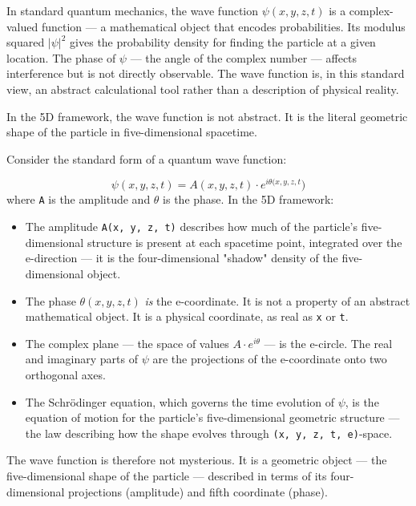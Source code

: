 \documentclass[aps,prd,preprint,superscriptaddress,longbibliography,floatfix]{revtex4-2}
\theoremstyle{remark}
\begin{document}
In standard quantum mechanics, the wave function $\psi(x, y, z, t)$ is a complex-valued function --- a mathematical object that encodes probabilities. Its modulus squared $|\psi|^{2}$ gives the probability density for finding the particle at a given location. The phase of $\psi$ --- the angle of the complex number --- affects interference but is not directly observable. The wave function is, in this standard view, an abstract calculational tool rather than a description of physical reality.

In the 5D framework, the wave function is not abstract. It is the literal geometric shape of the particle in five-dimensional spacetime.

Consider the standard form of a quantum wave function:


\begin{equation}
    \psi(x, y, z, t) = A(x, y, z, t) \cdot e^{i\theta(x,y,z,t})
\end{equation}
where \texttt{A} is the amplitude and $\theta$ is the phase. In the 5D framework:


\begin{itemize}
  \item The amplitude \texttt{A(x, y, z, t)} describes how much of the particle's five-dimensional structure is present at each spacetime point, integrated over the e-direction --- it is the four-dimensional "shadow" density of the five-dimensional object.
  \item The phase $\theta(x, y, z, t)$ \textit{is} the e-coordinate. It is not a property of an abstract mathematical object. It is a physical coordinate, as real as \texttt{x} or \texttt{t}.
  \item The complex plane --- the space of values $A\cdot e^{i\theta}$ --- is the e-circle. The real and imaginary parts of $\psi$ are the projections of the e-coordinate onto two orthogonal axes.
  \item The Schr\"{o}dinger equation, which governs the time evolution of $\psi$, is the equation of motion for the particle's five-dimensional geometric structure --- the law describing how the shape evolves through \texttt{(x, y, z, t, e)}-space.
\end{itemize}

The wave function is therefore not mysterious. It is a geometric object --- the five-dimensional shape of the particle --- described in terms of its four-dimensional projections (amplitude) and fifth coordinate (phase).
\end{document}
